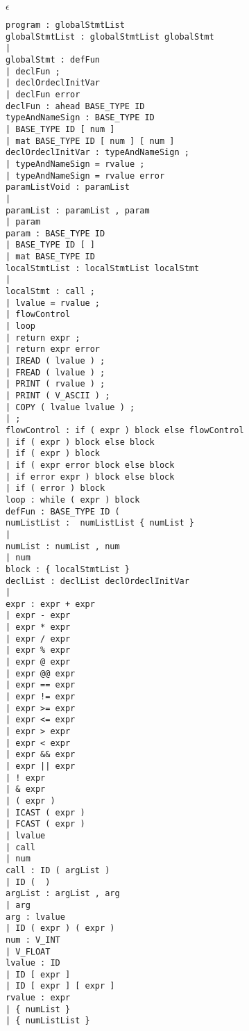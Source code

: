 $\epsilon$
\begin{lstlisting}[texcl=true]
program : globalStmtList 
globalStmtList : globalStmtList globalStmt
| 
globalStmt : defFun 
| declFun ; 
| declOrdeclInitVar
| declFun error
declFun : ahead BASE_TYPE ID 
typeAndNameSign : BASE_TYPE ID 
| BASE_TYPE ID [ num ] 
| mat BASE_TYPE ID [ num ] [ num ] 
declOrdeclInitVar : typeAndNameSign ;
| typeAndNameSign = rvalue ; 
| typeAndNameSign = rvalue error
paramListVoid : paramList 
| 
paramList : paramList , param 
| param 
param : BASE_TYPE ID 
| BASE_TYPE ID [ ] 
| mat BASE_TYPE ID 
localStmtList : localStmtList localStmt 
| 
localStmt : call ; 
| lvalue = rvalue ;  
| flowControl 
| loop 
| return expr ; 
| return expr error
| IREAD ( lvalue ) ; 
| FREAD ( lvalue ) ; 
| PRINT ( rvalue ) ; 
| PRINT ( V_ASCII ) ; 
| COPY ( lvalue lvalue ) ; 
| ; 
flowControl : if ( expr ) block else flowControl 
| if ( expr ) block else block 
| if ( expr ) block 
| if ( expr error block else block 
| if error expr ) block else block 
| if ( error ) block 
loop : while ( expr ) block 
defFun : BASE_TYPE ID (
numListList :  numListList { numList } 
| 
numList : numList , num 
| num 
block : { localStmtList } 
declList : declList declOrdeclInitVar 
| 
expr : expr + expr 
| expr - expr 
| expr * expr 
| expr / expr 
| expr % expr 
| expr @ expr 
| expr @@ expr 
| expr == expr 
| expr != expr 
| expr >= expr 
| expr <= expr 
| expr > expr 
| expr < expr 
| expr && expr 
| expr || expr 
| ! expr 
| & expr 
| ( expr ) 
| ICAST ( expr ) 
| FCAST ( expr ) 
| lvalue
| call 
| num 
call : ID ( argList ) 
| ID (  ) 
argList : argList , arg 
| arg 
arg : lvalue 
| ID ( expr ) ( expr ) 
num : V_INT 
| V_FLOAT 
lvalue : ID 
| ID [ expr ] 
| ID [ expr ] [ expr ] 
rvalue : expr
| { numList } 
| { numListList }

\end{lstlisting}